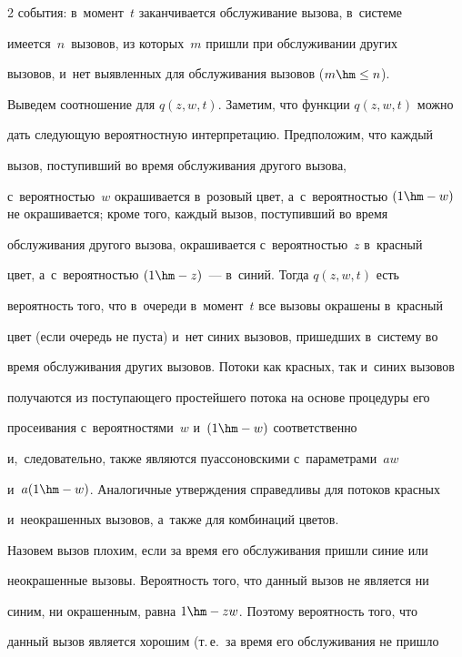 \begin{multicols}{2}
события: в~момент~$t$ заканчивается обслуживание вызова, в~системе 


имеется~$n$~вызовов, из которых~$m$ пришли при обслуживании других 


вызовов, и~нет выявленных для обслуживания вызовов ($m\hm\leq n$). 


  


  Выведем соотношение для $q(z,w,t)$. Заметим, что функции $q(z,w,t)$ можно 


дать следующую вероятностную интерпретацию. Предположим, что каждый 


вызов, поступивший во время обслуживания другого вызова, 


с~вероятностью~$w$ окрашивается в~розовый цвет, а~с~вероятностью $(1\hm-


w)$ не окрашивается; кроме того, каждый вызов, поступивший во время 


обслуживания другого вызова, окрашивается с~вероятностью~$z$ в~красный 


цвет, а~с~вероятностью $(1\hm- z)$~--- в~синий. Тогда $q(z,w,t)$ есть 


вероятность того, что в~очереди в~момент~$t$ все вызовы окрашены в~красный 


цвет (если очередь не пуста) и~нет синих вызовов, пришедших в~систему во 


время обслуживания других вызовов. Потоки как красных, так и~синих вызовов 


получаются из поступающего простейшего потока на основе процедуры его 


просеивания с~вероятностями~$w$ и~$(1\hm- w)$ соответственно 


и,~следовательно, также являются пуассоновскими с~параметрами~$a w$ 


и~$a(1\hm-w)$. Аналогичные утверждения справедливы для потоков красных 


и~неокрашенных вызовов, а~также для комбинаций цветов.


  


  Назовем вызов плохим, если за время его обслуживания пришли синие или 


неокрашенные вызовы. Вероятность того, что данный вызов не является ни 


синим, ни окрашенным, равна $1\hm-zw$. Поэтому вероятность того, что 


данный вызов является хорошим (т.\,е.\ за время его обслуживания не пришло 



\end{multicols}

